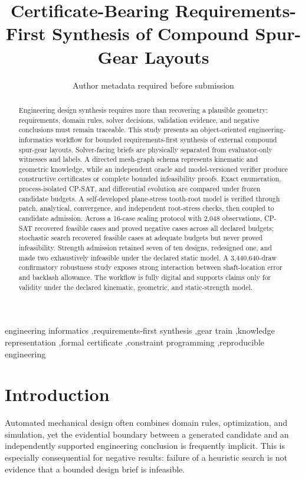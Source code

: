 \documentclass[preprint,12pt]{elsarticle}
\begin{document}
\begin{frontmatter}
\title{Certificate-Bearing Requirements-First Synthesis of Compound Spur-Gear Layouts}
\author{Author metadata required before submission}
\begin{abstract}
Engineering design synthesis requires more than recovering a plausible geometry: requirements, domain rules, solver decisions, validation evidence, and negative conclusions must remain traceable. This study presents an object-oriented engineering-informatics workflow for bounded requirements-first synthesis of external compound spur-gear layouts. Solver-facing briefs are physically separated from evaluator-only witnesses and labels. A directed mesh-graph schema represents kinematic and geometric knowledge, while an independent oracle and model-versioned verifier produce constructive certificates or complete bounded infeasibility proofs. Exact enumeration, process-isolated CP-SAT, and differential evolution are compared under frozen candidate budgets. A self-developed plane-stress tooth-root model is verified through patch, analytical, convergence, and independent root-stress checks, then coupled to candidate admission. Across a 16-case scaling protocol with 2,048 observations, CP-SAT recovered feasible cases and proved negative cases across all declared budgets; stochastic search recovered feasible cases at adequate budgets but never proved infeasibility. Strength admission retained seven of ten designs, redesigned one, and made two exhaustively infeasible under the declared static model. A 3,440,640-draw confirmatory robustness study exposes strong interaction between shaft-location error and backlash allowance. The workflow is fully digital and supports claims only for validity under the declared kinematic, geometric, and static-strength model.
\end{abstract}
\begin{keyword}
engineering informatics \sep requirements-first synthesis \sep gear train \sep knowledge representation \sep formal certificate \sep constraint programming \sep reproducible engineering
\end{keyword}
\end{frontmatter}
\section{Introduction}
Automated mechanical design often combines domain rules, optimization, and simulation, yet the evidential boundary between a generated candidate and an independently supported engineering conclusion is frequently implicit. This is especially consequential for negative results: failure of a heuristic search is not evidence that a bounded design brief is infeasible.
\end{document}
